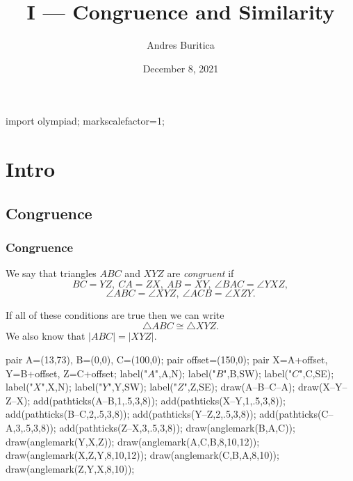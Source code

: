 \documentclass{beamer}
\title{I --- Congruence and Similarity}
\author{Andres Buritica}
\date{December 8, 2021}
\begin{document}
\begin{asydef}
  import olympiad;
  markscalefactor=1;
\end{asydef}
\begin{frame}[fragile]
  \titlepage{}
\end{frame}
\section{Intro}
  \subsection{Congruence}
    \begin{frame}[fragile]
      \frametitle{Congruence}
      We say that triangles $ABC$ and $XYZ$ are \emph{congruent} if $$BC=YZ,\ CA=ZX,\
      AB=XY,\ \angle BAC=\angle YXZ,$$
      $$\angle ABC=\angle XYZ,\ \angle ACB=\angle XZY.$$

      If all of these conditions are true then we can write $$\triangle
      ABC\cong\triangle XYZ.$$ We also know that $|ABC| = |XYZ|$.
      
      \begin{center}
        \begin{asy}
          pair A=(13,73), B=(0,0), C=(100,0);
          pair offset=(150,0);
          pair X=A+offset, Y=B+offset, Z=C+offset;
          label("$A$",A,N);
          label("$B$",B,SW);
          label("$C$",C,SE);
          label("$X$",X,N);
          label("$Y$",Y,SW);
          label("$Z$",Z,SE);
          draw(A--B--C--A);
          draw(X--Y--Z--X);
          add(pathticks(A--B,1,.5,3,8));
          add(pathticks(X--Y,1,.5,3,8));
          add(pathticks(B--C,2,.5,3,8));
          add(pathticks(Y--Z,2,.5,3,8));
          add(pathticks(C--A,3,.5,3,8));
          add(pathticks(Z--X,3,.5,3,8));
          draw(anglemark(B,A,C));
          draw(anglemark(Y,X,Z));
          draw(anglemark(A,C,B,8,10,12));
          draw(anglemark(X,Z,Y,8,10,12));
          draw(anglemark(C,B,A,8,10));
          draw(anglemark(Z,Y,X,8,10));
        \end{asy}
      \end{center}
    \end{frame}
\end{document}

